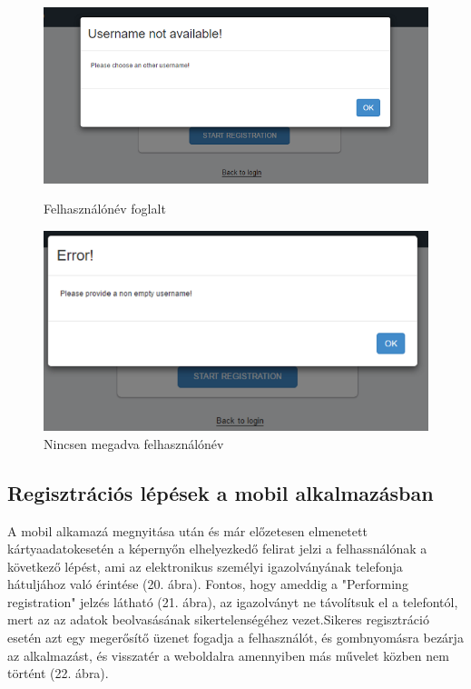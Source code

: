 \begin{figure}[h]
 \begin{minipage}{.50\textwidth} 
\centering
    \includegraphics[scale=0.40]{img/username_not_available}
    \caption{Felhasználónév foglalt}
 \end{minipage}
 \begin{minipage}{.50\textwidth} 
\centering
     \includegraphics[scale=0.40]{img/username_empty}
     \caption{Nincsen megadva felhasználónév}
 \end{minipage}
\end{figure}

\subsection{Regisztrációs lépések a mobil alkalmazásban}
A mobil alkamazá megnyitása után és már előzetesen elmenetett kártyaadatokesetén a képernyőn elhelyezkedő felirat jelzi a felhassnálónak a következő lépést, ami az elektronikus személyi igazolványának telefonja hátuljához való érintése (20. ábra). Fontos, hogy ameddig a "Performing registration" jelzés látható (21. ábra), az igazolványt ne távolítsuk el a telefontól, mert az az adatok beolvasásának sikertelenségéhez vezet.Sikeres regisztráció esetén azt egy megerősítő üzenet fogadja a felhasználót, és gombnyomásra bezárja az alkalmazást, és visszatér a weboldalra amennyiben más művelet közben nem történt (22. ábra).

